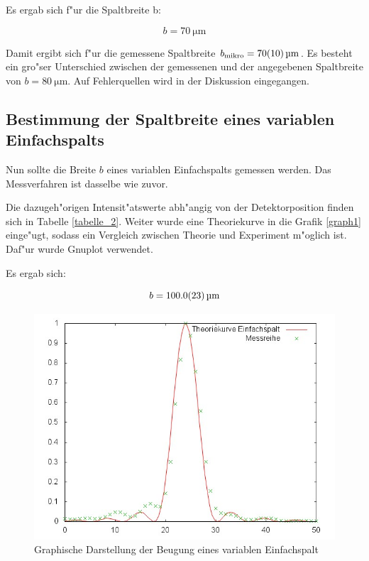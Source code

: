 			Es ergab sich f"ur die Spaltbreite b:

			\begin{equation}
				b = \SI{70}{\micro \meter}
			\end{equation}

			Damit ergibt sich f"ur die gemessene Spaltbreite $b_\mathrm{mikro} = \SI{70 (10)}{\micro \meter}$.
			Es besteht ein gro"ser Unterschied zwischen der gemessenen und der angegebenen Spaltbreite von $b = \SI{80}{\micro \meter}$.
			Auf Fehlerquellen wird in der Diskussion eingegangen.
			\clearpage
			\newpage

	\subsection{Bestimmung der Spaltbreite eines variablen Einfachspalts} 
		\label{sub:bestimmung_der_spaltbreite_eines_variablen_einfachspalts}
		
		Nun sollte die Breite $b$ eines variablen Einfachspalts gemessen werden. Das Messverfahren ist dasselbe wie zuvor.

		Die dazugeh"origen Intensit"atswerte abh"angig von der Detektorposition finden sich in Tabelle \ref{tabelle_2}. Weiter wurde eine Theoriekurve in die Grafik \ref{graph1} einge"ugt, sodass ein Vergleich zwischen Theorie und Experiment m"oglich ist. Daf"ur wurde Gnuplot verwendet.

		Es ergab sich:

		\begin{equation}
			b = \SI{100.0 (23)}{\micro \meter}
		\end{equation}

		

		\begin{figure}[H]
			\centering
			\includegraphics[width = 14cm]{graph2.jpg}
			\caption{Graphische Darstellung der Beugung eines variablen Einfachspalt}
			\label{graph2}
		\end{figure}

